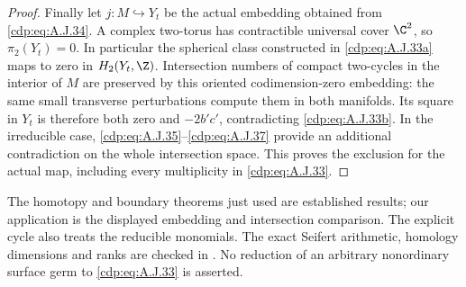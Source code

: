 \begin{proof}
Finally let $j:M\hookrightarrow Y_t$ be the actual
embedding obtained from \eqref{cdp:eq:A.J.34}. A complex two-torus
has contractible universal cover $\C^2$, so
$\pi_2(Y_t)=0$. In particular the spherical class
constructed in \eqref{cdp:eq:A.J.33a} maps to zero in
$H_2(Y_t,\Z)$. Intersection numbers of compact
two-cycles in the interior of $M$ are preserved by
this oriented codimension-zero embedding: the same
small transverse perturbations compute them in
both manifolds. Its square in $Y_t$ is therefore
both zero and $-2b'c'$, contradicting \eqref{cdp:eq:A.J.33b}.
In the irreducible case, \eqref{cdp:eq:A.J.35}--\eqref{cdp:eq:A.J.37} provide
an additional contradiction on the whole intersection
space.
This proves the exclusion for the actual map,
including every multiplicity in \eqref{cdp:eq:A.J.33}.
\end{proof}

The homotopy and boundary theorems just used are
established results; our application is the displayed
embedding and intersection comparison. The explicit
cycle also treats the reducible monomials. The exact
Seifert arithmetic, homology dimensions and ranks
are checked in . No
reduction of an arbitrary nonordinary surface germ
to \eqref{cdp:eq:A.J.33} is asserted.


